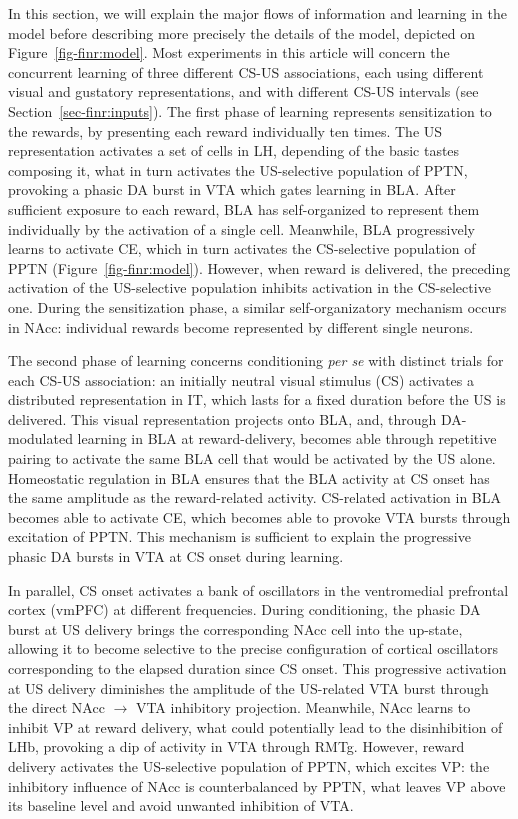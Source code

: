 \documentclass[
  11pt,
  a4paper,
]{scrbook}
\begin{document}
In this section, we will explain the major flows of information and
learning in the model before describing more precisely the details of
the model, depicted on Figure~\ref{fig-finr:model}. Most experiments in
this article will concern the concurrent learning of three different
CS-US associations, each using different visual and gustatory
representations, and with different CS-US intervals (see
Section~\ref{sec-finr:inputs}). The first phase of learning represents
sensitization to the rewards, by presenting each reward individually ten
times. The US representation activates a set of cells in LH, depending
of the basic tastes composing it, what in turn activates the
US-selective population of PPTN, provoking a phasic DA burst in VTA
which gates learning in BLA. After sufficient exposure to each reward,
BLA has self-organized to represent them individually by the activation
of a single cell. Meanwhile, BLA progressively learns to activate CE,
which in turn activates the CS-selective population of PPTN
(Figure~\ref{fig-finr:model}). However, when reward is delivered, the
preceding activation of the US-selective population inhibits activation
in the CS-selective one. During the sensitization phase, a similar
self-organizatory mechanism occurs in NAcc: individual rewards become
represented by different single neurons.

The second phase of learning concerns conditioning \emph{per se} with
distinct trials for each CS-US association: an initially neutral visual
stimulus (CS) activates a distributed representation in IT, which lasts
for a fixed duration before the US is delivered. This visual
representation projects onto BLA, and, through DA-modulated learning in
BLA at reward-delivery, becomes able through repetitive pairing to
activate the same BLA cell that would be activated by the US alone.
Homeostatic regulation in BLA ensures that the BLA activity at CS onset
has the same amplitude as the reward-related activity. CS-related
activation in BLA becomes able to activate CE, which becomes able to
provoke VTA bursts through excitation of PPTN. This mechanism is
sufficient to explain the progressive phasic DA bursts in VTA at CS
onset during learning.

In parallel, CS onset activates a bank of oscillators in the
ventromedial prefrontal cortex (vmPFC) at different frequencies. During
conditioning, the phasic DA burst at US delivery brings the
corresponding NAcc cell into the up-state, allowing it to become
selective to the precise configuration of cortical oscillators
corresponding to the elapsed duration since CS onset. This progressive
activation at US delivery diminishes the amplitude of the US-related VTA
burst through the direct NAcc \(\rightarrow\) VTA inhibitory projection.
Meanwhile, NAcc learns to inhibit VP at reward delivery, what could
potentially lead to the disinhibition of LHb, provoking a dip of
activity in VTA through RMTg. However, reward delivery activates the
US-selective population of PPTN, which excites VP: the inhibitory
influence of NAcc is counterbalanced by PPTN, what leaves VP above its
baseline level and avoid unwanted inhibition of VTA.
\end{document}
